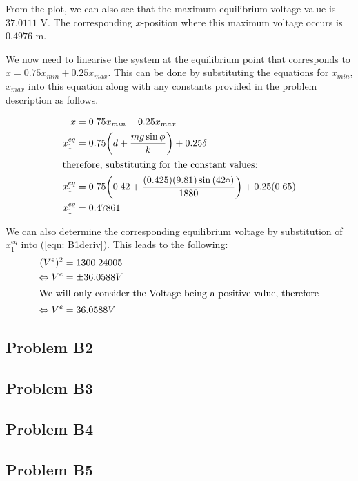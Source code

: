 \documentclass[a4paper,10pt,reqno]{amsart}
\numberwithin{equation}{section}
\begin{document}
From the plot, we can also see that the maximum equilibrium voltage value is $37.0111$ V. The corresponding $x$-position where this maximum voltage occurs is $0.4976$ m.


We now need to linearise the system at the equilibrium point that corresponds to $x=0.75x_{min}+0.25x_{max}$.
This can be done by substituting the equations for $x_{min}$, $x_{max}$ into this equation along with any constants provided in the problem description as follows.

\begin{align}
x &= 0.75x_{min} + 0.25 x_{max}\nonumber \\
x_1^{eq} &= 0.75 \bigg(d + \frac{mg \sin{\phi}}{k}\bigg) + 0.25 \delta \nonumber \\
\intertext{therefore, substituting for the constant values:}
x_1^{eq} &= 0.75 \bigg(0.42 + \frac{(0.425)(9.81) \sin{(42 \circ)}}{1880}\bigg) + 0.25(0.65) \nonumber \\
x_1^{eq} &= 0.47861 \label{eqn: xvalue}
\end{align}

We can also determine the corresponding equilibrium voltage by substitution of $x_1^{eq}$ into (\ref{eqn: B1deriv}).
This leads to the following:
\begin{align}
(V^e)^2 &= 1300.24005 \nonumber \\
\Leftrightarrow V^e &= \pm 36.0588 V \nonumber \\
\intertext{We will only consider the Voltage being a positive value, therefore}
\Leftrightarrow V^e &= 36.0588 V \label{eqn: Ve value}
\end{align}



\subsection{Problem B2}\label{sec:b2}


\subsection{Problem B3}\label{sec:b3}


\subsection{Problem B4}\label{sec:b4}




\subsection{Problem B5}\label{sec:b5}
\end{document}
